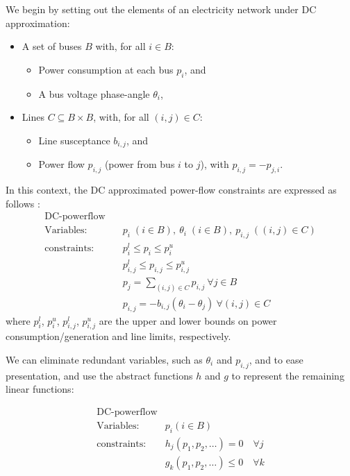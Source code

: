 We begin by setting out the elements of an electricity network under DC approximation:
\begin{itemize}
    \item A set of buses $B$ with, for all $i\in B$:
    \begin{itemize} 
        \item Power consumption at each bus $p_i$, and 
        \item A bus voltage phase-angle $\theta_i$,
    \end{itemize}
    \item Lines $C\subseteq B\times B$, with, for all $(i,j)\in C$: 
        \begin{itemize} 
        \item Line susceptance $b_{i,j}$, and 
        \item Power flow $p_{i,j}$ (power from bus $i$ to $j$), with $p_{i,j}=-p_{j,i}$. 
    \end{itemize}
\end{itemize}
In this context, the DC approximated power-flow constraints are expressed as follows \cite{Wang1}:
\begin{equation}
\label{dcopf1}
\begin{aligned}
\text{DC-powerflow} \quad& \\
\text{Variables:} \quad&  p_i\; (i\in B),\ \theta_i\; (i\in B),\ p_{i,j}\; ((i,j)\in C) \\
\text{constraints:} \quad& p_i^{l}\le p_i \le p_i^{u} \\
&p_{i,j}^l \le p_{i,j} \le p_{i,j}^u \\
&p_j = \sum_{(i,j)\in C}p_{i,j}~\forall j\in B\\
&p_{i,j} = -b_{i,j}(\theta_i - \theta_j) ~\forall(i,j)\in C
\end{aligned}
\end{equation}
where $p_i^{l}$, $p_i^{u}$, $p_{i,j}^l$, $p_{i,j}^u$ are the upper and lower bounds on power consumption/generation and line limits, respectively.

We can eliminate redundant variables, such as $\theta_i$ and $p_{i,j}$, and to ease presentation, and use the abstract functions $h$ and $g$ to represent the remaining linear functions:

\begin{equation}
\label{dcopf2}
\begin{aligned}
\text{DC-powerflow}\\
\text{Variables:}\quad & p_i (i\in B) \\
\text{constraints:}\quad & h_j(p_1,p_2,\dots)=0\quad \forall j\\
& g_k(p_1,p_2,\dots)\le 0 \quad \forall k
\end{aligned}
\end{equation}

